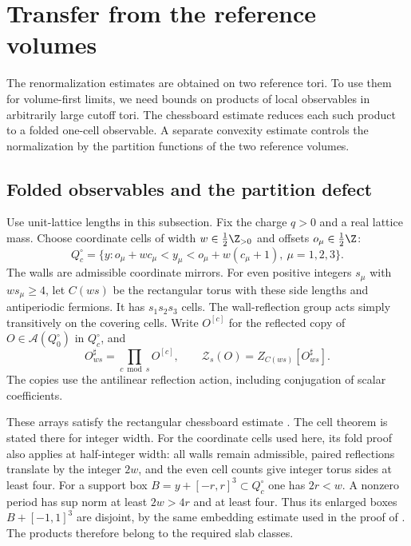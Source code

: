 \section{Transfer from the reference volumes}\label{sec:uniform-transfer}

The renormalization estimates are obtained on two reference tori.
To use them for volume-first limits, we need bounds on products
of local observables in arbitrarily large cutoff tori. The
chessboard estimate reduces each such product to a folded
one-cell observable. A separate convexity estimate controls
the normalization by the partition functions of the two
reference volumes.

\subsection{Folded observables and the partition defect}

Use unit-lattice lengths in this subsection. Fix the charge $q>0$
and a real lattice mass. Choose coordinate cells of width
$w\in\tfrac12\Z_{>0}$ and offsets $o_\mu\in\tfrac12\Z$:
\[
 Q_c^\circ=\{y:o_\mu+wc_\mu<y_\mu<o_\mu+w(c_\mu+1),\
                           \mu=1,2,3\}.
\]
The walls are admissible coordinate mirrors. For even positive
integers $s_\mu$ with $ws_\mu\ge4$, let $C(ws)$ be the rectangular
torus with these side lengths and antiperiodic fermions.
It has $s_1s_2s_3$ cells. The wall-reflection group acts simply
transitively on the covering cells. Write $O^{[c]}$ for the
reflected copy of $O\in\mathcal A(Q_0^\circ)$ in $Q_c^\circ$,
and
\[
 O^\sharp_{ws}=\prod_{c\bmod s}O^{[c]},\qquad
 \mathcal Z_s(O)=Z_{C(ws)}[O^\sharp_{ws}].
\]
The copies use the antilinear reflection action, including
conjugation of scalar coefficients.

These arrays satisfy the rectangular chessboard estimate
\cite[(69)]{ChamberLattice}. The cell theorem is stated there for integer width.
For the coordinate cells used here, its fold proof also applies
at half-integer width: all walls remain admissible, paired
reflections translate by the integer $2w$, and the even cell
counts give integer torus sides at least four.
For a support box $B=y+[-r,r]^3\subset Q_c^\circ$ one has
$2r<w$. A nonzero period has sup norm at least $2w>4r$
and at least four. Thus its enlarged boxes $B+[-1,1]^3$
are disjoint, by the same embedding estimate used in the
proof of \cite[Proposition~4.3]{ChamberLattice}.
The products therefore belong to the required slab classes.

